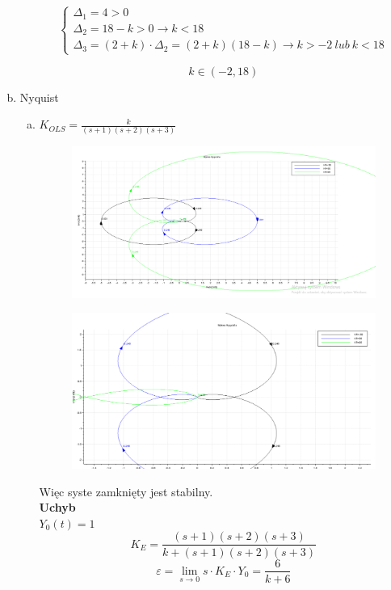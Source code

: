 \documentclass{article}
\begin{document}
\begin{enumerate}[a)]
\begin{enumerate}[a)]
        \[\begin{cases}
            \Delta_{1}=4>0
            \\
            \Delta_{2}=18-k>0 \rightarrow k<18
            \\
            \Delta_{3}=\left(2+k\right)\cdot \Delta_{2}=\left(2+k\right) \left(18-k\right) \rightarrow k>-2 \ lub \ k<18
        \end{cases}\]
        
        $$k \in \left(-2, 18\right)$$
    \end{enumerate}
    
    \newpage

    \item Nyquist
    
    \begin{enumerate}[a)]
        \item $K_{OLS}=\frac{k}{\left(s + 1\right) \left(s + 2\right) \left(s + 3\right)}$
        
        \begin{figure}[h!]
            \includegraphics[width=12cm]{nq1.png}
            \centering
        \end{figure}

        \begin{figure}[h!]
            \includegraphics[width=12cm]{nq2.png}
            \centering
        \end{figure}
        Więc syste zamknięty jest stabilny.
        \\ \textbf{Uchyb}\\
        $Y_0(t)=1$
        $$K_E=\frac{\left(s + 1\right) \left(s + 2\right) \left(s + 3\right)}{k + \left(s + 1\right) \left(s + 2\right) \left(s + 3\right)}$$
        $$\varepsilon=\lim_{s \rightarrow 0} {s\cdot K_E\cdot Y_0}=\frac{6}{k + 6}$$
        

\end{enumerate}
\end{enumerate}
\end{document}
